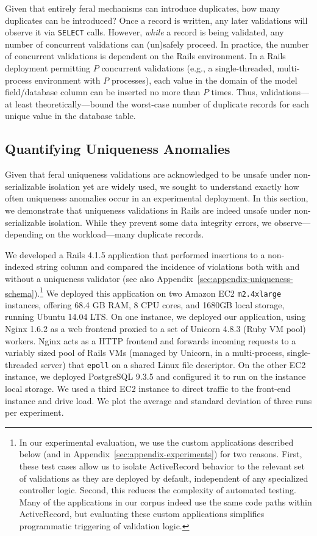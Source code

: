  Given that entirely feral
mechanisms can introduce duplicates, how many duplicates can be
introduced? Once a record is written, any later validations will
observe it via \texttt{SELECT} calls. However, \textit{while} a record
is being validated, any number of concurrent validations can
(un)safely proceed. In practice, the number of concurrent validations
is dependent on the Rails environment. In a Rails deployment
permitting $P$ concurrent validations (e.g., a single-threaded,
multi-process environment with $P$ processes), each value in the
domain of the model field/database column can be inserted no more than
$P$ times. Thus, validations---at least theoretically---bound the
worst-case number of duplicate records for each unique value in the
database table.

\subsection{Quantifying Uniqueness Anomalies}

Given that feral uniqueness validations are acknowledged to be unsafe
under non-serializable isolation yet are widely used, we sought to
understand exactly how often uniqueness anomalies occur in an
experimental deployment. In this section, we demonstrate that
uniqueness validations in Rails are indeed unsafe under
non-serializable isolation. While they prevent some data integrity
errors, we observe---depending on the workload---many duplicate
records.

 We developed a Rails 4.1.5 application
that performed insertions to a non-indexed string column and compared
the incidence of violations both with and without a uniqueness
validator (see also
Appendix~\ref{sec:appendix-uniqueness-schema}).\footnote{In our
  experimental evaluation, we use the custom applications described
  below (and in Appendix~\ref{sec:appendix-experiments}) for two
  reasons. First, these test cases allow us to isolate ActiveRecord
  behavior to the relevant set of validations as they are deployed by
  default, independent of any specialized controller logic. Second,
  this reduces the complexity of automated testing. Many of the
  applications in our corpus indeed use the same code paths within
  ActiveRecord, but evaluating these custom applications simplifies
  programmatic triggering of validation logic.} We deployed this
application on two Amazon EC2 \texttt{m2.4xlarge} instances, offering
68.4 GB RAM, 8 CPU cores, and 1680GB local storage, running Ubuntu
14.04 LTS. On one instance, we deployed our application, using Nginx
1.6.2 as a web frontend proxied to a set of Unicorn 4.8.3 (Ruby VM
pool) workers. Nginx acts as a HTTP frontend and forwards incoming
requests to a variably sized pool of Rails VMs (managed by Unicorn, in
a multi-process, single-threaded server) that \texttt{epoll} on a
shared Linux file descriptor. On the other EC2 instance, we deployed
PostgreSQL 9.3.5 and configured it to run on the instance local
storage. We used a third EC2 instance to direct traffic to the
front-end instance and drive load. We plot the average and standard
deviation of three runs per experiment.


